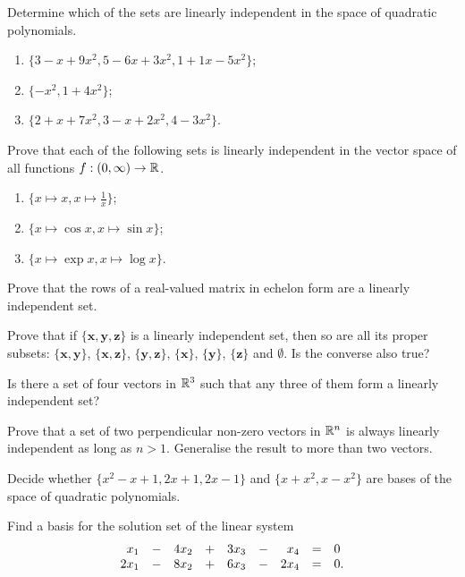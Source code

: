 \begin{exercise}{}{}
 Determine which of the sets are linearly independent in the space of quadratic 
 polynomials.
 \begin{enumerate}[label=(\alph*)]
  \item $\{3-x+9x^2,5-6x+3x^2,1+1x-5x^2\}$;
  \item $\{-x^2,1+4x^2\}$;
  \item $\{2+x+7x^2,3-x+2x^2,4-3x^2\}$.
 \end{enumerate}
\end{exercise}
\begin{exercise}{}{}
 Prove that each of the following sets is linearly independent in the vector
 space of all functions $f:(0,\infty) \to \mathbb{R}$.
 \begin{enumerate}[label=(\alph*)]
  \item $\{x \mapsto x,x \mapsto \frac{1}{x}\}$;
  \item $\{x \mapsto \cos x,x \mapsto \sin x\}$;
  \item $\{x \mapsto \exp x,x \mapsto \log x\}$.
 \end{enumerate}
\end{exercise}
\begin{exercise}{}{}
 Prove that the rows of a real-valued matrix in echelon form are a linearly
 independent set.
\end{exercise}
\begin{exercise}{}{}
 Prove that if $\{\mathbf{x},\mathbf{y},\mathbf{z}\}$ is a linearly independent
 set, then so are all its proper subsets: $\{\mathbf{x},\mathbf{y}\}$,
 $\{\mathbf{x},\mathbf{z}\}$, $\{\mathbf{y},\mathbf{z}\}$, $\{\mathbf{x}\}$,
 $\{\mathbf{y}\}$, $\{\mathbf{z}\}$ and $\emptyset$. Is the converse also true?
\end{exercise}
\begin{exercise}{}{}
 Is there a set of four vectors in $\mathbb{R}^3$ such that any three of them form a
 linearly independent set?
\end{exercise}
\begin{exercise}{}{}
 Prove that a set of two perpendicular non-zero vectors in $\mathbb{R}^{n}$ is always
 linearly independent as long as $n > 1$. Generalise the result to more than two
 vectors.
\end{exercise}
\begin{exercise}{}{}
 Decide whether $\{x^2 - x + 1, 2x + 1,2x - 1\}$ and $\{x + x^2,x - x^2\}$ are bases
 of the space of quadratic polynomials.
\end{exercise}
\begin{exercise}{}{}
 Find a basis for the solution set of the linear system
 \[
  \begin{array}{r c r c r c r c l}
   x_1 & - & 4x_2 & + & 3x_3 & - & x_4 & = & 0\\
   2x_1 & - & 8x_2 & + & 6x_3 & - & 2x_4 & = & 0.
  \end{array}
 \]
\end{exercise}
